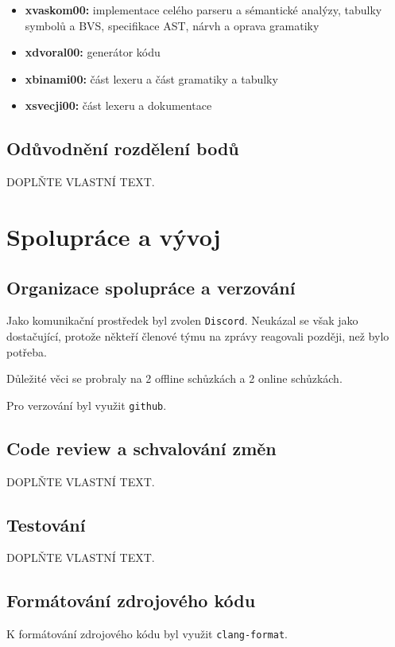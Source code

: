 \documentclass[10pt,a4paper]{article}
\begin{document}
\begin{itemize}
    \item \textbf{xvaskom00:} implementace celého parseru a sémantické analýzy, tabulky symbolů a BVS, specifikace AST, nárvh a oprava gramatiky
    \item \textbf{xdvoral00:} generátor kódu 
    \item \textbf{xbinami00:} část lexeru a část gramatiky a tabulky
    \item \textbf{xsvecji00:} část lexeru a dokumentace
\end{itemize}

\subsection{Odůvodnění rozdělení bodů}
DOPLŇTE VLASTNÍ TEXT.

\section{Spolupráce a vývoj}
\subsection{Organizace spolupráce a verzování}
Jako komunikační prostředek byl zvolen \texttt{Discord}. Neukázal se však jako dostačující, protože někteří členové týmu na zprávy reagovali později, než bylo potřeba.

Důležité věci se probraly na 2 offline schůzkách a 2 online schůzkách.

Pro verzování byl využit \texttt{github}. 



\subsection{Code review a schvalování změn}
DOPLŇTE VLASTNÍ TEXT.

\subsection{Testování}
DOPLŇTE VLASTNÍ TEXT.

\subsection{Formátování zdrojového kódu}
K formátování zdrojového kódu byl využit \texttt{clang-format}.
\end{document}
